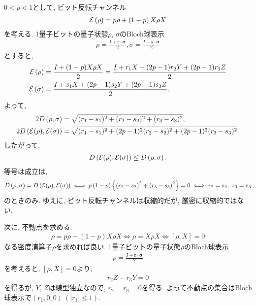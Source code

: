 \begin{ex}
    \label{ex9.13}
    $0 < p < 1$として, ビット反転チャンネル
    \begin{align*}
        \mathcal{E}\left( \rho\right) = p \rho + \left(1-p\right)X \rho X
    \end{align*}
    を考える. 1量子ビットの量子状態$\rho$, $\sigma$のBloch球表示
    \begin{align*}
        \rho = \frac{I + \bm{r} \cdot \bm{\sigma}}{2},
        \sigma = \frac{I + \bm{s} \cdot \bm{\sigma}}{2}
    \end{align*}
    とすると,
    \begin{align*}
        \mathcal{E} \left( \rho\right)
         & =
        \frac{I + (1-p) X \rho X}{2}
        =
        \frac{I + r_1 X + (2p-1)r_2Y + (2p-1)r_3Z}{2} \\
        \mathcal{E} \left( \sigma\right)
         & =
        \frac{I + s_1 X + (2p-1)s_2Y + (2p-1)s_3Z}{2}.
    \end{align*}
    よって, 
    \begin{align*}
        2 D \left( \rho, \sigma\right) &= \sqrt{(r_1 - s_1)^2 + (r_2 - s_2)^2 + (r_3 - s_3)^2}, \\
        2 D \left( \mathcal{E}(\rho), \mathcal{E}(\sigma)\right) &=
        \sqrt{(r_1 - s_1)^2 + (2p-1)^2(r_2 - s_2)^2 + (2p-1)^2(r_3 - s_3)^2}.
    \end{align*}
    したがって, 
    \begin{align*}
        D \left( \mathcal{E}(\rho), \mathcal{E}(\sigma)\right)
        \leq
        D \left(\rho, \sigma\right).
    \end{align*}
    等号は成立は,
    \begin{align*}
        D \left( \rho, \sigma\right) 
        =
        D \left( \mathcal{E}(\rho), \mathcal{E}(\sigma)\right)
        \iff
        p\left(1-p\right)
        \left\{ 
            \left(r_2 - s_2\right)^2 
            +
            \left(r_3 - s_3\right)^2 
        \right\}
        =
        0
        \iff
        r_2 = s_2, \ r_3 = s_3
    \end{align*}
    のときのみ. ゆえに, ビット反転チャンネルは収縮的だが, 厳密に収縮的ではない. 
    \par
    次に, 不動点を求める. 
    \begin{align*}
        \rho = p \rho + \left(1-p\right)X \rho X
        \iff
        \rho = X \rho X
        \iff 
        \left[ \rho, X\right] = 0
    \end{align*} 
    なる密度演算子$\rho$を求めれば良い. 1量子ビットの量子状態$\rho$のBloch球表示
    \begin{align*}
        \rho = \frac{I + \bm{r} \cdot \bm{\sigma}}{2}
    \end{align*}
    を考えると, $\left[\rho, X\right] = 0$より, 
    \begin{align*}
        r_2 Z - r_3 Y = 0
    \end{align*}
    を得るが, $Y$, $Z$は線型独立なので, $r_2 = r_3 = 0$を得る. よって不動点の集合はBloch球表示で$(r_1, 0, 0) \ \left( \left| r_1 \right| \le 1\right)$.
\end{ex}

